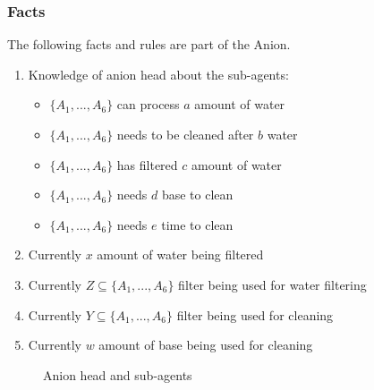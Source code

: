 \subsubsection{Facts}
The following facts and rules are part of the Anion.

\begin{enumerate}
	\item
	Knowledge of anion head about the sub-agents:
	\begin{itemize}
		\item {$\{A_1, ..., A_6\}$ can process $a$ amount of water}
		\item {$\{A_1, ..., A_6\}$ needs to be cleaned after $b$ water}
		\item {$\{A_1, ..., A_6\}$ has filtered $c$ amount of water}
		\item {$\{A_1, ..., A_6\}$ needs $d$ base to clean}
		\item {$\{A_1, ..., A_6\}$ needs $e$ time to clean}
	\end{itemize}
	\item
	Currently $x$ amount of water being filtered 
	\item
	Currently $Z \subseteq \{A_1, ..., A_6\}$ filter being used for water filtering
	\item
	Currently $Y \subseteq \{A_1, ..., A_6\}$ filter being used for cleaning
	\item
	Currently $w$ amount of base being used for cleaning
\end{enumerate}

\begin{figure}[h]
	
	\centering
	\caption{Anion head and sub-agents}
	\label{fig:anion-head-sub}
	
\end{figure}

